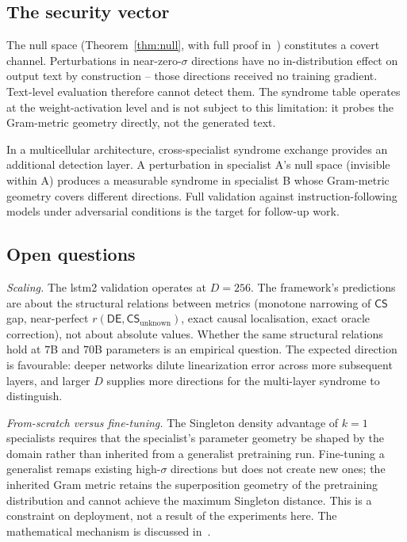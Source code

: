 \documentclass[11pt,a4paper]{article}
\newcommand{\CS}{\mathsf{CS}}
\newcommand{\DE}{\mathsf{DE}}
\begin{document}
\subsection{The security vector}
\label{sec:disc-security}

The null space (Theorem~\ref{thm:null}, with full proof in~\cite{SyndromeAlgebra}) constitutes a covert channel. Perturbations in near-zero-$\sigma$ directions have no in-distribution effect on output text by construction -- those directions received no training gradient. Text-level evaluation therefore cannot detect them. The syndrome table operates at the weight-activation level and is not subject to this limitation: it probes the Gram-metric geometry directly, not the generated text.

In a multicellular architecture, cross-specialist syndrome exchange provides an additional detection layer. A perturbation in specialist A's null space (invisible within A) produces a measurable syndrome in specialist B whose Gram-metric geometry covers different directions. Full validation against instruction-following models under adversarial conditions is the target for follow-up work.


\subsection{Open questions}
\label{sec:disc-open}

\emph{Scaling.} The lstm2 validation operates at $D = 256$. The framework's predictions are about the structural relations between metrics (monotone narrowing of $\CS$ gap, near-perfect $r(\DE, \CS_{\mathrm{unknown}})$, exact causal localisation, exact oracle correction), not about absolute values. Whether the same structural relations hold at $7$B and $70$B parameters is an empirical question. The expected direction is favourable: deeper networks dilute linearization error across more subsequent layers, and larger $D$ supplies more directions for the multi-layer syndrome to distinguish.

\emph{From-scratch versus fine-tuning.} The Singleton density advantage of $k = 1$ specialists requires that the specialist's parameter geometry be shaped by the domain rather than inherited from a generalist pretraining run. Fine-tuning a generalist remaps existing high-$\sigma$ directions but does not create new ones; the inherited Gram metric retains the superposition geometry of the pretraining distribution and cannot achieve the maximum Singleton distance. This is a constraint on deployment, not a result of the experiments here. The mathematical mechanism is discussed in~\cite{SyndromeAlgebra}.
\end{document}
